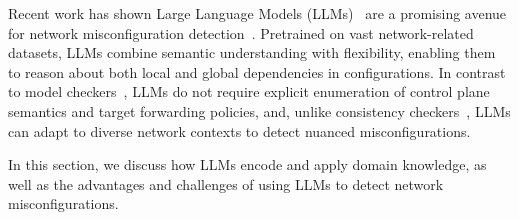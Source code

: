 
Recent work has shown Large Language Models (LLMs)~\cite{deepseekai2024deepseekv3technicalreport, openai_gpt4o} are a promising avenue for network misconfiguration detection~\cite{bogdanov2024leveraging, chen2024automatic, wang2024identifying, lian2023configuration}.
Pretrained on vast network-related datasets, LLMs combine semantic understanding with flexibility, enabling them to reason about both local and global dependencies in configurations.
In contrast to model checkers~\cite{fogel2015general, beckett2017general, abhashkumar2020tiramisu, prabhu2020plankton, zhang2022sre, steffen2020netdice, ye2020hoyan, ritchey2000using,al2011configchecker, jeffrey2009model, batfish}, LLMs do not require explicit enumeration of control plane semantics and target forwarding policies, and, unlike consistency checkers~\cite{kakarla2024diffy,kakarla2020finding, le2006minerals, feamster2005detecting, tang2021campion, le2008detecting, le2006characterization, batfish}, LLMs can adapt to diverse network contexts to detect nuanced misconfigurations. 

In this section, we discuss how LLMs encode and apply domain knowledge, as well as the advantages and challenges of using LLMs to detect network misconfigurations.

